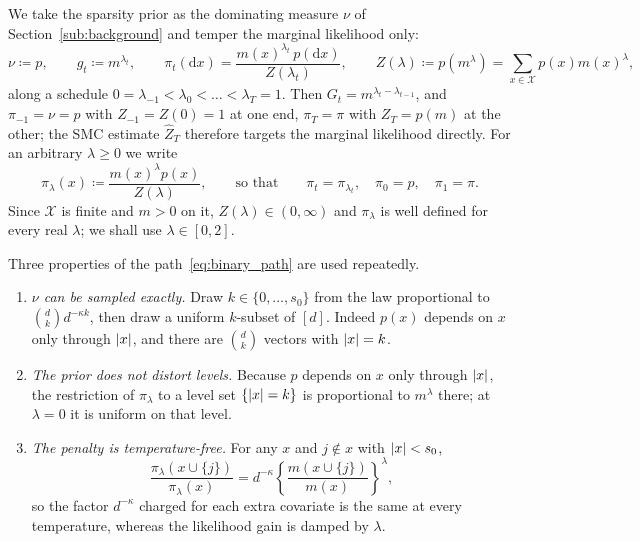 \documentclass[aos]{imsart}%
\DeclarePairedDelimiter{\abs}{\lvert}{\rvert}
\newcommand{\ambientspace}[0]{\mathcal{X}}
\newcommand{\dd}[0]{\mathrm{d}}
\theoremstyle{plain}
\theoremstyle{definition}
\begin{document}
    We take the sparsity prior as the dominating measure $\nu$ of
    Section~\ref{sub:background} and temper the marginal likelihood only:
    \begin{equation}
        \label{eq:binary_path}
        \nu\coloneq p,\qquad g_t\coloneq m^{\lambda_t},\qquad
        \pi_t(\dd x)=\frac{m(x)^{\lambda_t}\,p(\dd x)}{Z(\lambda_t)},
        \qquad Z(\lambda)\coloneq p(m^{\lambda})=\sum_{x\in\ambientspace}p(x)m(x)^{\lambda},
    \end{equation}
    along a schedule $0=\lambda_{-1}<\lambda_0<\dots<\lambda_T=1$. Then
    $G_t=m^{\lambda_t-\lambda_{t-1}}$, and $\pi_{-1}=\nu=p$ with $Z_{-1}=Z(0)=1$
    at one end, $\pi_T=\pi$ with $Z_T=p(m)$ at the other; the SMC estimate
    $\widehat Z_T$ therefore targets the marginal likelihood directly. For an
    arbitrary $\lambda\geq0$ we write
    \begin{equation}
        \label{eq:binary_pilambda}
        \pi_\lambda(x)\coloneq\frac{m(x)^{\lambda}p(x)}{Z(\lambda)},
        \qquad\text{so that}\qquad \pi_t=\pi_{\lambda_t},\quad
        \pi_0=p,\quad\pi_1=\pi .
    \end{equation}
    Since $\ambientspace$ is finite and $m>0$ on it, $Z(\lambda)\in(0,\infty)$
    and $\pi_\lambda$ is well defined for every real $\lambda$; we shall use
    $\lambda\in[0,2]$.

    Three properties of the path~\eqref{eq:binary_path} are used repeatedly.

    \begin{enumerate}[label=(P\arabic*),leftmargin=3.4em]
        \item\label{P:exact} \emph{$\nu$ can be sampled exactly.} Draw
        $k\in\{0,\dots,s_0\}$ from the law proportional to
        $\binom{d}{k}d^{-\kappa k}$, then draw a uniform $k$-subset of $[d]$.
        Indeed $p(x)$ depends on $x$ only through $\abs{x}$, and there are
        $\binom dk$ vectors with $\abs x=k$.

        \item\label{P:level} \emph{The prior does not distort levels.} Because
        $p$ depends on $x$ only through $\abs x$, the restriction of
        $\pi_\lambda$ to a level set $\{\abs x=k\}$ is proportional to
        $m^{\lambda}$ there; at $\lambda=0$ it is uniform on that level.

        \item\label{P:penalty} \emph{The penalty is temperature-free.} For any
        $x$ and $j\notin x$ with $\abs x<s_0$,
        \begin{equation}
            \label{eq:binary_onestep}
            \frac{\pi_\lambda(x\cup\{j\})}{\pi_\lambda(x)}
            =d^{-\kappa}\left\{\frac{m(x\cup\{j\})}{m(x)}\right\}^{\lambda},
        \end{equation}
        so the factor $d^{-\kappa}$ charged for each extra covariate is the same
        at every temperature, whereas the likelihood gain is damped by
        $\lambda$.
    \end{enumerate}
\end{document}
